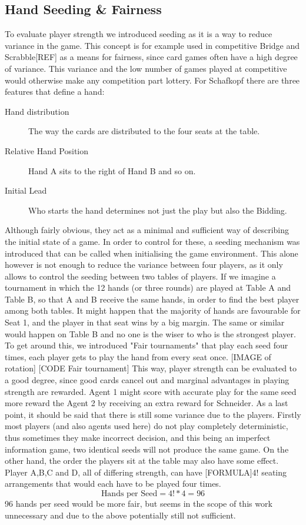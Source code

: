 \subsection{Hand Seeding \& Fairness}
To evaluate player strength we introduced seeding as it is a way to reduce variance in the game.
This concept is for example used in competitive Bridge and Scrabble[REF] as a means for fairness, since card games
often have a high degree of variance.
This variance and the low number of games played at competitive would otherwise make any competition part lottery.
\newline
For Schafkopf there are three features that define a hand:
\begin{description}
    \item [Hand distribution] The way the cards are distributed to the four seats at the table.
    \item [Relative Hand Position] Hand A sits to the right of Hand B and so on.
    \item [Initial Lead] Who starts the hand determines not just the play but also the Bidding.
\end{description}
Although fairly obvious, they act as a minimal and sufficient way of describing the initial state of a game.
In order to control for these, a seeding mechanism was introduced that can be called when initialising the game
environment.
This alone however is not enough to reduce the variance between four players, as it only allows to control the
seeding between two tables of players.
\newline
If we imagine a tournament in which the 12 hands (or three rounds) are played at Table A and Table B, so that A and B
receive the same hands, in order to find the best player among both tables.
It might happen that the majority of hands are favourable for Seat 1, and the player in that seat wins by a big margin.
The same or similar would happen on Table B and no one is the wiser to who is the strongest player.
\newline
To get around this, we introduced "Fair tournaments" that play each seed four times, each player gets to play the hand
from every seat once.
[IMAGE of rotation]
[CODE Fair tournament]
This way, player strength can be evaluated to a good degree, since good cards cancel out and marginal
advantages in playing strength are rewarded.
Agent 1 might score with accurate play for the same seed more reward the Agent 2 by receiving an extra reward for
Schneider.
\newline
As a last point, it should be said that there is still some variance due to the players.
Firstly most players (and also agents used here) do not play completely deterministic, thus sometimes they make
incorrect decision, and this being an imperfect information game, two identical seeds will not produce the same game.
\newline
On the other hand, the order the players sit at the table may also have some effect.
Player A,B,C and D, all of differing strength, can have [FORMULA]4! seating arrangements that would each have to be
played four times.
\[\text{Hands per Seed} = 4! * 4 = 96\]
96 hands per seed would be more fair, but seems in the scope of this work unnecessary and due to the above
potentially still not sufficient.


